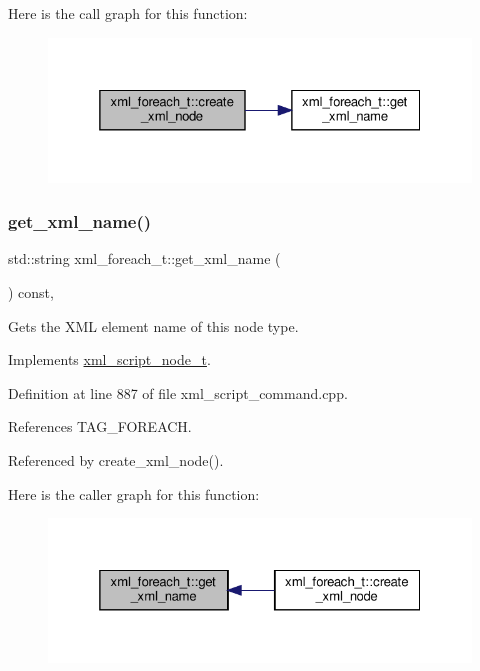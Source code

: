 Here is the call graph for this function\+:
\nopagebreak
\begin{figure}[H]
\begin{center}
\leavevmode
\includegraphics[width=325pt]{d1/dc9/structxml__foreach__t_a6056d8114277e5aad52bf31408bd24a2_cgraph}
\end{center}
\end{figure}
\mbox{\label{structxml__foreach__t_ad1bf3053ce2cc69b9b6a02402b7f9c22}} 
\subsubsection{\texorpdfstring{get\+\_\+xml\+\_\+name()}{get\_xml\_name()}}
{\footnotesize\ttfamily std\+::string xml\+\_\+foreach\+\_\+t\+::get\+\_\+xml\+\_\+name (\begin{DoxyParamCaption}{ }\end{DoxyParamCaption}) const\hspace{0.3cm}{\ttfamily [override]}, {\ttfamily [virtual]}}



Gets the X\+ML element name of this node type. 



Implements \hyperlink{classxml__script__node__t_af5815fab8924e5e4f47ba1b7266b6cb8}{xml\+\_\+script\+\_\+node\+\_\+t}.



Definition at line 887 of file xml\+\_\+script\+\_\+command.\+cpp.



References T\+A\+G\+\_\+\+F\+O\+R\+E\+A\+CH.



Referenced by create\+\_\+xml\+\_\+node().

Here is the caller graph for this function\+:
\nopagebreak
\begin{figure}[H]
\begin{center}
\leavevmode
\includegraphics[width=325pt]{d1/dc9/structxml__foreach__t_ad1bf3053ce2cc69b9b6a02402b7f9c22_icgraph}
\end{center}
\end{figure}


